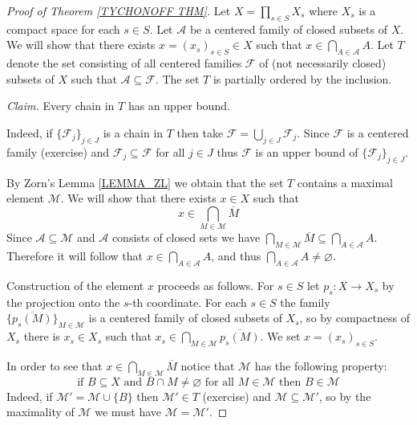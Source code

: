 \documentclass[11pt, letterpaper, oneside]{report}
\theoremstyle{pplain}
\newtheorem{ITERMVALUE THM}[theorem]{Intermediate Value Theorem}
\newtheorem{HEINEBOREL THM}[theorem]{Heine-Borel Theorem}
\newtheorem{UMETR THM}[theorem]{Urysohn Metrization Theorem}
\newtheorem{UMETR2 THM}[theorem]{Urysohn Metrization Theorem (v.2)}
\theoremstyle{ddefinition}
\theoremstyle{nnn}
\newtheorem{TDA NN}[theorem]{Topological Data Analysis. }
\theoremstyle{eexercise}
\renewcommand{\AA}{{\mathcal A}}
\newcommand{\FF}{{\mathcal F}}
\newcommand{\MM}{{\mathcal M}}
\begin{document}
\begin{proof}[Proof of Theorem \ref{TYCHONOFF THM}]
Let $X = \prod_{s\in S} X_{s}$ where $X_{s}$ is a compact space for each $s\in S$. 
Let $\AA$ be a  centered family of closed subsets of $X$. 
We will show that there exists $x = (x_{s})_{s\in S}\in X$ such that $x\in \bigcap_{A\in \AA} A$.
Let $T$ denote the set consisting of all centered families $\FF$ of (not necessarily closed)
subsets of $X$ such that $\AA\subseteq \FF$. The set $T$ is partially ordered by the inclusion. 

\emph{Claim.} Every chain in $T$ has an upper bound. 

Indeed, if $\{\FF_{j}\}_{j\in J}$ is a chain in $T$ then take $\FF = \bigcup_{j\in J} \FF_{j}$. 
Since $\FF$ is a centered family (exercise) and $\FF_{j}\subseteq \FF$ for all $j\in J$ thus $\FF$ is an 
upper bound of $\{\FF_{j}\}_{j\in J}$.  


By Zorn's Lemma \ref{LEMMA_ZL} we obtain that the set $T$ contains a maximal element $\MM$. 
We will show that there exists $x\in X$ such that 
$$x\in \bigcap_{M\in \MM} \overline{M}$$
Since $\AA\subseteq \MM$ and $\AA$ consists of closed sets 
we have $\bigcap_{M\in \MM} \overline{M} \subseteq \bigcap_{A\in\AA} A$. Therefore it will
follow that $x\in \bigcap_{A\in \AA} A$, and thus $\bigcap_{A\in \AA} A\neq \varnothing$. 

Construction of the element $x$ proceeds as follows. For $s\in S$ let $p_{s}\colon X\to X_{s}$
by the projection onto the $s$-th coordinate. For each $s\in S$ the family 
$\{\overline{p_{s}(M)}\}_{M\in \MM}$ is a centered family of closed subsets of $X_{s}$, so by 
compactness of $X_{s}$ there is $x_{s}\in X_{s}$ such that 
$x_{s}\in \bigcap_{M\in \MM} \overline{p_{s}(M)}$. We set $x= (x_{s})_{s\in S}$.  


In order to see that $x\in \bigcap_{M\in \MM} \overline{M}$ notice that $\MM$ has the following property:
\begin{equation*}
\label{MAX CENT PROP EQ}
\text{if $B\subseteq X$ and $B\cap M\neq \varnothing$ for all $M\in \MM$ then $B\in \MM$}
\tag{$\ast$}
\end{equation*}
Indeed, if  $\MM' = \MM \cup \{B\}$ then $\MM' \in T$ (exercise) and $\MM\subseteq \MM'$, 
so by the maximality of $\MM$ we must have $\MM= \MM'$. 



\end{proof}
\end{document}
